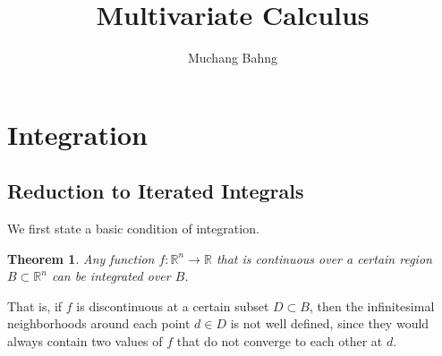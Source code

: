 \documentclass{article}
\newtheorem{theorem}{Theorem}[section]
\theoremstyle{remark}
\theoremstyle{definition}
\begin{document}
\pagestyle{fancy}

\cfoot{\thepage / \pageref{LastPage}}

\title{Multivariate Calculus}
\author{Muchang Bahng}

\maketitle

\section{Integration}

\subsection{Reduction to Iterated Integrals}

We first state a basic condition of integration. 

\begin{theorem}
Any function $f: \mathbb{R}^n \longrightarrow \mathbb{R}$ that is continuous over a certain region $B \subset \mathbb{R}^n$ can be integrated over $B$. 
\end{theorem}
That is, if $f$ is discontinuous at a certain subset $D \subset B$, then the infinitesimal neighborhoods around each point $d \in D$ is not well defined, since they would always contain two values of $f$ that do not converge to each other at $d$. 
\end{document}
